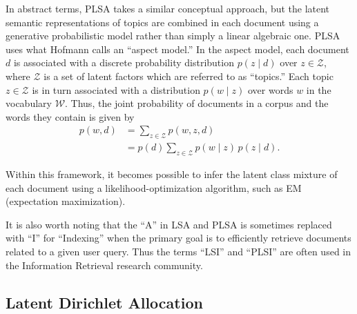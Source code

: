 \documentclass{article}
\begin{document}
In abstract terms, PLSA takes a similar conceptual approach, but the latent semantic representations of topics are combined in each document using a generative probabilistic model rather than simply a linear algebraic one.
PLSA uses what Hofmann \cite{hofmann1999plsa} calls an ``aspect model.''
In the aspect model, each document $d$ is associated with a discrete probability distribution $p(z \mid d)$ over $z \in \mathcal Z$, where $\mathcal Z$ is a set of latent factors which are referred to as ``topics.''
Each topic $z \in \mathcal Z$ is in turn associated with a distribution $p(w \mid z)$ over words $w$ in the vocabulary $\mathcal W$.
Thus, the joint probability of documents in a corpus and the words they contain is given by
\begin{align*}
p(w, d)
&= \sum_{z \in \mathcal Z} p(w, z, d) \\
&= p(d) \sum_{z \in \mathcal Z} p(w \mid z) \, p(z \mid d).
\end{align*}

Within this framework, it becomes possible to infer the latent class mixture of each document using a likelihood-optimization algorithm, such as EM (expectation maximization).

It is also worth noting that the ``A'' in LSA and PLSA is sometimes replaced with ``I'' for ``Indexing'' when the primary goal is to efficiently retrieve documents related to a given user query.
Thus the terms ``LSI'' and ``PLSI'' are often used in the Information Retrieval research community.

\subsection{Latent Dirichlet Allocation}
\end{document}

